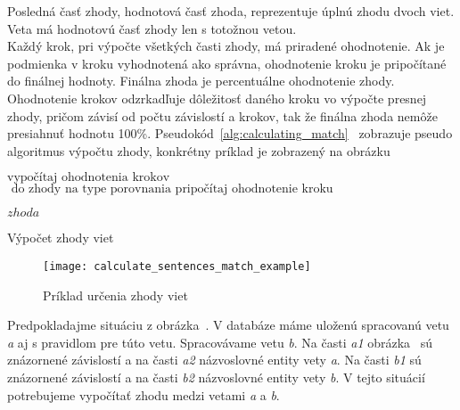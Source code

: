 Posledná časť zhody, hodnotová časť zhoda, reprezentuje úplnú zhodu dvoch viet. Veta má hodnotovú časť zhody len s totožnou vetou. \\

Každý krok, pri výpočte všetkých časti zhody, má priradené ohodnotenie. Ak je podmienka v kroku vyhodnotená ako správna, ohodnotenie kroku je pripočítané do finálnej hodnoty. Finálna zhoda je percentuálne ohodnotenie zhody. Ohodnotenie krokov odzrkadľuje dôležitosť daného kroku vo výpočte presnej zhody, pričom závisí od počtu závislostí a krokov, tak že finálna zhoda nemôže presiahnuť hodnotu 100\%. Pseudokód~\ref{alg:calculating_match}~ zobrazuje pseudo algoritmus výpočtu zhody, konkrétny príklad je zobrazený na obrázku~

\begin{algorithm}[H]
	\footnotesize %
	\begin{algorithmic}[1]

		\State $\text{vypočítaj ohodnotenia krokov}$
		\State $\text{ do zhody na type porovnania pripočítaj ohodnotenie kroku}$
		\EndIf
		\EndFor
		\EndFor
		\EndFor
		
		\Return $zhoda$
		\EndProcedure
	\end{algorithmic}
	\caption[Výpočet zhody viet]{Výpočet zhody viet}	
	\label{alg:calculating_match}
\end{algorithm}

\begin{figure}[H]
	\begin{center}\texttt{[image: calculate\_sentences\_match\_example]}\end{center}
	\caption[Príklad určenia zhody viet]{Príklad určenia zhody viet}\label{fig:calculate_match_sentences_example}
\end{figure}

Predpokladajme situáciu z obrázka~. V databáze máme uloženú spracovanú vetu \textit{a} aj s pravidlom pre túto vetu. Spracovávame vetu \textit{b}. Na časti \textit{a1} obrázka~ sú znázornené závislostí a na časti \textit{a2} názvoslovné entity vety \textit{a}. Na časti \textit{b1} sú znázornené závislostí a na časti \textit{b2} názvoslovné entity vety \textit{b}. V tejto situácií potrebujeme vypočítať zhodu medzi vetami \textit{a} a \textit{b}. 

